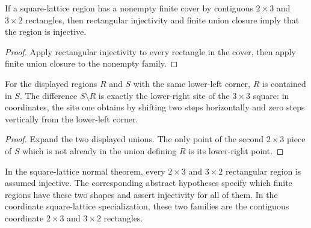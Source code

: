 \begin{lemma}%
    \label{lem:peps_normalSquareRectangleCover_injective}
    \leanok
    If a square-lattice region has a nonempty finite cover by contiguous
    $2\times3$ and $3\times2$ rectangles, then rectangular injectivity and
    finite union closure imply that the region is injective.
\end{lemma}
\begin{proof}\leanok
    Apply rectangular injectivity to every rectangle in the cover, then apply
    finite union closure to the nonempty family.
\end{proof}

\begin{lemma}%
    \label{lem:peps_normalSquareRegionR_regionS_difference}
    \leanok
    For the displayed regions $R$ and $S$ with the same lower-left corner,
    $R$ is contained in $S$. The difference $S\setminus R$ is exactly
    the lower-right site of the $3\times3$ square: in coordinates, the site
    one obtains by shifting two steps horizontally and zero steps vertically
    from the lower-left corner.
\end{lemma}
\begin{proof}\leanok
    Expand the two displayed unions. The only point of the second
    $2\times3$ piece of $S$ which is not already in the union defining
    $R$ is its lower-right point.
\end{proof}

\begin{definition}%
    \label{def:peps_normalRectangleInjectivityHypotheses}
    \leanok
    In the square-lattice normal theorem, every $2\times 3$ and
    $3\times 2$ rectangular region is assumed injective. The corresponding
    abstract hypotheses specify which finite regions have these two shapes and
    assert injectivity for all of them. In the coordinate square-lattice
    specialization, these two families are the contiguous coordinate
    $2\times 3$ and $3\times 2$ rectangles.
\end{definition}

